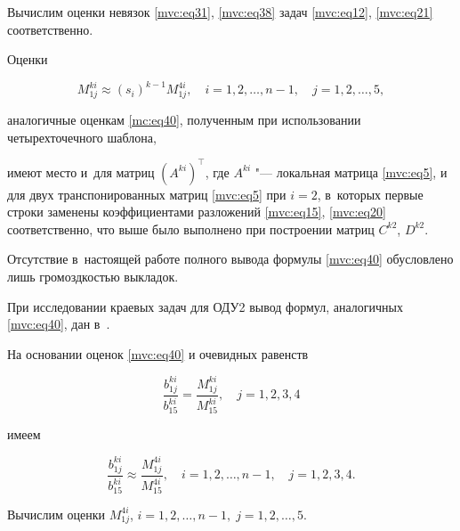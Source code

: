 Вычислим оценки невязок \eqref{mvc:eq31}, \eqref{mvc:eq38} задач \eqref{mvc:eq12}, \eqref{mvc:eq21} соответственно.

Оценки

\begin{equation}

\label{mvc:eq40}

M_{1j}^{ki}\approx (s_i)^{k-1} M_{1j}^{4i},\quad i=1,  2,  \dots,  n-1,\quad j=1,  2,  \dots,  5,

\end{equation}

аналогичные оценкам \eqref{mc:eq40}, полученным при использовании четырехточечного шаблона,

имеют место и~для матриц $(A^{ki})^\top$,  где $A^{ki}$ "--- локальная матрица \eqref{mvc:eq5}, и для двух транспонированных матриц \eqref{mvc:eq5} при $i=2$, в~которых первые строки заменены коэффициентами разложений \eqref{mvc:eq15}, \eqref{mvc:eq20} соответственно, что выше было выполнено при построении матриц $C^{k2}$,  $D^{k2}$.

Отсутствие в~настоящей работе полного вывода формулы \eqref{mvc:eq40} обусловлено лишь громоздкостью выкладок. 

При исследовании краевых задач для ОДУ2 вывод формул, аналогичных \eqref{mvc:eq40}, дан в~\cite{mc:bib2}.







На основании оценок \eqref{mvc:eq40} и очевидных равенств

\begin{equation}

\label{mvc:eq41}

   \frac{b_{1j}^{ki}}{b_{15}^{ki}}=\frac{M_{1j}^{ki}}{M_{15}^{ki}},\quad  j=1,  2,  3,  4

\end{equation}

имеем

\begin{equation}

\label{mvc:eq42}

   \frac{b_{1j}^{ki}}{b_{15}^{ki}}\approx\frac{M_{1j}^{4i}}{M_{15}^{4i}},\quad 

i=1,  2,  \dots,  n-1,\quad  j=1,  2,  3,  4.

\end{equation}



Вычислим оценки $M_{1j}^{4i}$, $i=1,  2,  \dots,  n-1,\; j=1,  2,  \dots,  5$. %

